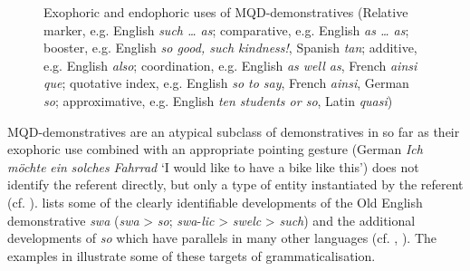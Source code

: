 \documentclass[output=paper,colorlinks,citecolor=brown]{langscibook}
\begin{document}
\begin{figure}
\caption{Exophoric and endophoric uses of MQD-demonstratives \newline (Relative marker, e.g. English \textit{such … as}; comparative, e.g. English \textit{as … as}; booster, e.g. English \textit{so good, such kindness!}, Spanish \textit{tan}; additive, e.g. English \textit{also}; coordination, e.g. English \textit{as well as}, French \textit{ainsi que}; quotative index, e.g. English \textit{so to say}, French \textit{ainsi}, German \textit{so}; approximative, e.g. English \textit{ten students or so}, Latin \textit{quasi})}
\label{fig:koenig:1}
\end{figure}

MQD-demonstratives are an atypical subclass of demonstratives in so far as their exophoric use combined with an appropriate pointing gesture (German \textit{Ich} \textit{möchte} \textit{ein} \textit{solches} \textit{Fahrrad} ‘I would like to have a bike like this’) does not identify the referent directly, but only a type of entity instantiated by the referent (cf. \citealt{UmbachGust2014,KönigUmbach2018}).  lists some of the clearly identifiable developments of the Old English demonstrative \textit{swa} (\textit{swa} > \textit{so}; \textit{swa}{}-\textit{lic} > \textit{swelc} > \textit{such}) and the additional developments of \textit{so} which have parallels in many other languages (cf. \citealt{König2012}, \citeyear{König2015}). The examples in  illustrate some of these targets of grammaticalisation.
\end{document}
